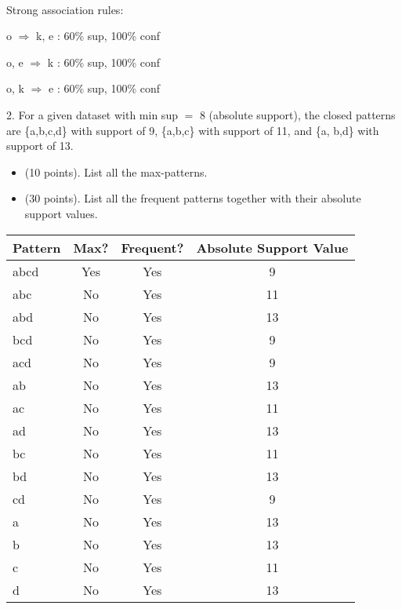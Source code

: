 \documentclass[12pt]{article}
\newcommand{\mt}[1]{\ensuremath{#1}}
\newcommand{\rar}{ \mt{\Rightarrow} }     %
\newcommand{\bk}[1]{\{#1\}}
\newcommand{\eql}{\mt{=} }
\begin{document}
\

Strong association rules:

o \rar k, e : 60\% sup, 100\% conf

o, e \rar k : 60\% sup, 100\% conf

o, k \rar e : 60\% sup, 100\% conf

2. For a given dataset with min sup \eql 8 (absolute support), the closed patterns are \bk{a,b,c,d} with support of 9, \bk{a,b,c} with support of 11, and \bk{a, b,d} with support of 13.

\begin{itemize}
  \item (10 points). List all the max-patterns.
  \item (30 points). List all the frequent patterns together with their absolute support values.
\end{itemize}

\begin{tabular}{l|ccc}
  Pattern & Max? & Frequent? & Absolute Support Value \\
  \hline
  abcd & Yes & Yes & 9 \\
  abc & No & Yes & 11 \\
  abd & No & Yes & 13 \\
  bcd & No & Yes & 9 \\
  acd & No & Yes & 9 \\
  ab & No & Yes & 13 \\
  ac & No & Yes & 11 \\
  ad & No & Yes & 13 \\
  bc & No & Yes & 11 \\
  bd & No & Yes & 13 \\ 
  cd & No & Yes & 9 \\
  a & No & Yes & 13 \\
  b & No & Yes & 13 \\
  c & No & Yes & 11 \\ 
  d & No & Yes & 13
\end{tabular}
\end{document}
